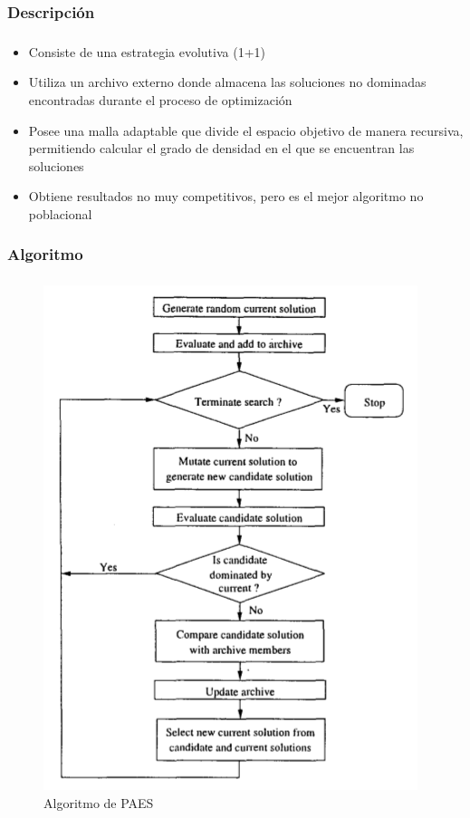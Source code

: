 \documentclass[serif]{beamer}
\begin{document}
\subsubsection{Descripción}
\begin{frame}
\frametitle{\insertsubsubsection}
	\begin{itemize}\setlength{\itemsep}{4mm}
		\item Consiste de una estrategia evolutiva (1+1)
		\item Utiliza un archivo externo donde almacena las soluciones no dominadas encontradas durante el proceso de optimización
		\item Posee una malla adaptable que divide el espacio objetivo de manera recursiva, permitiendo calcular el grado de densidad en el que se encuentran las soluciones
		\item Obtiene resultados no muy competitivos, pero es el mejor algoritmo no poblacional
	\end{itemize}
\end{frame}

\subsubsection{Algoritmo}
\begin{frame}
\frametitle{\insertsubsubsection}
	\vspace*{-0.2cm}
	\begin{figure}
	\centering
	\includegraphics[height=0.9\textheight]{paes1.png}
	\caption{Algoritmo de PAES}
	\end{figure}
\end{frame}
\end{document}
